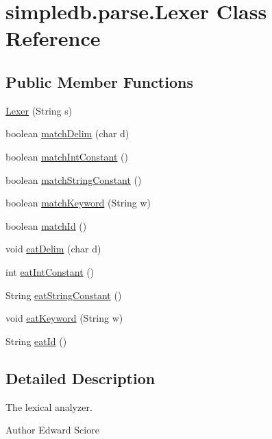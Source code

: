 \hypertarget{classsimpledb_1_1parse_1_1Lexer}{}\section{simpledb.\+parse.\+Lexer Class Reference}
\label{classsimpledb_1_1parse_1_1Lexer}
\subsection*{Public Member Functions}
\begin{DoxyCompactItemize}
\item 
\hyperlink{classsimpledb_1_1parse_1_1Lexer_a8c376102a2a444c7cda738ad0dce5113}{Lexer} (String s)
\item 
boolean \hyperlink{classsimpledb_1_1parse_1_1Lexer_ab63b0b6fbda48cb0523fcb2c83d3a514}{match\+Delim} (char d)
\item 
boolean \hyperlink{classsimpledb_1_1parse_1_1Lexer_a2356cc7664be66956a0282bae224f0af}{match\+Int\+Constant} ()
\item 
boolean \hyperlink{classsimpledb_1_1parse_1_1Lexer_aca5f9432fda019a69fe5a52dbfab0236}{match\+String\+Constant} ()
\item 
boolean \hyperlink{classsimpledb_1_1parse_1_1Lexer_ad7ef9a56476573552f41c072251a4106}{match\+Keyword} (String w)
\item 
boolean \hyperlink{classsimpledb_1_1parse_1_1Lexer_afce0043bfddfa1503110faace1e0ba5b}{match\+Id} ()
\item 
void \hyperlink{classsimpledb_1_1parse_1_1Lexer_a85d4e04dece07a2810c5fe4560efbed1}{eat\+Delim} (char d)
\item 
int \hyperlink{classsimpledb_1_1parse_1_1Lexer_a21315c8461ce8cf2b8de369252c12270}{eat\+Int\+Constant} ()
\item 
String \hyperlink{classsimpledb_1_1parse_1_1Lexer_a85a2a94288c68eadfaf8e48c5824bea8}{eat\+String\+Constant} ()
\item 
void \hyperlink{classsimpledb_1_1parse_1_1Lexer_a636868ec2864b11d552fe39180deea5f}{eat\+Keyword} (String w)
\item 
String \hyperlink{classsimpledb_1_1parse_1_1Lexer_a3c57900b25a12edc2c8542e62f101f0f}{eat\+Id} ()
\end{DoxyCompactItemize}


\subsection{Detailed Description}
The lexical analyzer. \begin{DoxyAuthor}{Author}
Edward Sciore 
\end{DoxyAuthor}


